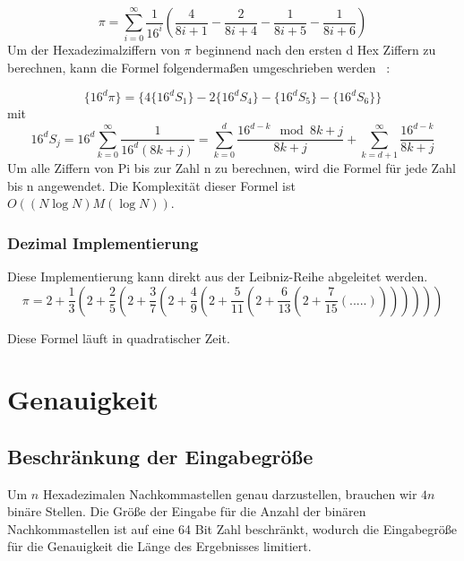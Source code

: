 \documentclass[course=erap]{aspdoc}
\begin{document}
\begin{equation*}
    \pi = \sum_{i=0}^{\infty} {\frac{1}{16^{i}} \left( \frac{4}{8i+1} - \frac{2}{8i+4} - \frac{1}{8i+5} - \frac{1}{8i+6} \right)}
\end{equation*}
Um der Hexadezimalziffern von $\pi$  beginnend nach den ersten d Hex Ziffern zu berechnen, kann die Formel folgendermaßen umgeschrieben werden ~\cite{BBPAlg}: 

\begin{equation*}
    \{16^{d}\pi\} = \{ 4\{16^{d}S_1\} - 2\{16^{d}S_4\} - \{16^{d}S_5\} - \{16^{d}S_6\} \} 
\end{equation*}
mit
\begin{equation*}
    16^{d} S_{j} = 16^{d} \sum_{k=0}^{\infty} {\frac{1}{16^{d} (8k + j)}} = {\sum_{k=0}^{d} {\frac{16^{d-k} \mod {8k + j}} {8k + j} + \sum_{k= d+1}^{\infty} {\frac {16^{d-k}} {8k + j} } } } 
\end{equation*}
Um alle Ziffern von Pi bis zur Zahl n zu berechnen, wird die Formel für jede Zahl bis n angewendet. Die Komplexität
dieser Formel ist $O((N\log N)M(\log N))$.~\cite{TimeBBP}

\subsubsection{Dezimal Implementierung}
Diese Implementierung kann direkt aus der Leibniz-Reihe abgeleitet werden.
\begin{equation*}
    \pi = 2 + \frac{1}{3} (2 + \frac{2}{5} (2 + \frac{3}{7} (2 + \frac{4}{9} (2 + \frac{5}{11} (2 + \frac{6}{13} (2 + \frac{7}{15}(.....) )  )  )  )  )  )  
\end{equation*}

Diese Formel läuft in quadratischer Zeit.~\cite{leibnizTime}


\section{Genauigkeit}

\subsection{Beschränkung der Eingabegröße}
Um $n$ Hexadezimalen Nachkommastellen genau darzustellen, brauchen wir $4n$ binäre Stellen. Die Größe der Eingabe für die Anzahl der binären Nachkommastellen ist auf eine 64 Bit Zahl beschränkt, wodurch die Eingabegröße für die Genauigkeit die Länge des Ergebnisses limitiert.
\end{document}
